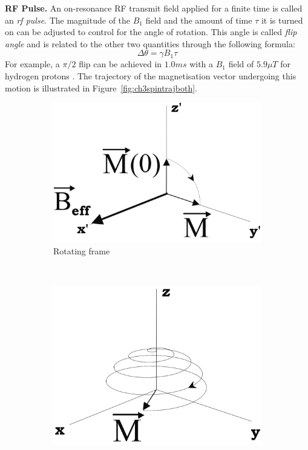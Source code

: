 \hfill

\textbf{RF Pulse.} An on-resonance RF transmit field applied for a finite time is called an \textit{rf pulse}. The magnitude of the $B_1$ field and the amount of time $\tau$ it is turned on can be adjusted to control for the angle of rotation. This angle is called \textit{flip angle} and is related to the other two quantities through the following formula:
\begin{equation}\label{eq:331}
    \Delta \theta = \gamma B_1 \tau
\end{equation}
For example, a $\pi/2$ flip can be achieved in $1.0 ms$ with a $B_1$ field of $5.9 \mu T$ for hydrogen protons \cite{Haacke1999}. The trajectory of the magnetisation vector undergoing this motion is illustrated in Figure~\ref{fig:ch3spintrajboth}.

\begin{figure}[ht]
    \centering
    \begin{subfigure}[b]{0.45\textwidth}
        \includegraphics[width=\textwidth]{images/mri/ch3spintraja}
        \caption{Rotating frame}
        \label{fig:ch3spintraja}
    \end{subfigure}
    ~ %
    \begin{subfigure}[b]{0.4\textwidth}
        \includegraphics[width=\textwidth]{images/mri/ch3spintrajb}

\end{subfigure}
\end{figure}
